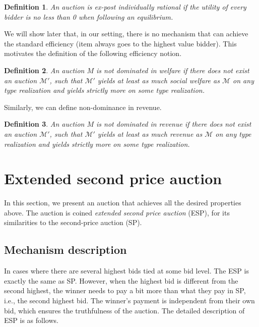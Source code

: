 \documentclass[letterpaper]{article}
\newtheorem{definition}{Definition}
\begin{document}
\begin{definition}
	An auction is {\em ex-post individually rational} if the utility of every bidder is no less than 0 when following an equilibrium.
\end{definition}

We will show later that, in our setting, there is no mechanism that can achieve the standard efficiency (item always goes to the highest value bidder). This motivates the definition of the following efficiency notion.

\begin{definition}
	An auction $M$ is not dominated in welfare if there does not exist an auction $\mathcal{M'}$, such that $\mathcal{M'}$ yields at least as much social welfare as $\mathcal{M}$ on any type realization and yields strictly more on some type realization.
\end{definition}

Similarly, we can define non-dominance in revenue.

\begin{definition}
	An auction $M$ is not dominated in revenue if there does not exist an auction $\mathcal{M'}$, such that $\mathcal{M'}$ yields at least as much revenue as $\mathcal{M}$ on any type realization and yields strictly more on some type realization.
\end{definition}


\section{Extended second price auction}

In this section, we present an auction that achieves all the desired properties above.
The auction is coined \textit{extended second price auction} (ESP), for its similarities to the second-price auction (SP).

\subsection{Mechanism description}

In cases where there are several highest bids tied at some bid level. The ESP is exactly the same as SP. However, when the highest bid is different from the second highest, the winner needs to pay a bit more than what they pay in SP, i.e., the second highest bid. The winner's payment is independent from their own bid, which ensures the truthfulness of the auction. The detailed description of ESP is as follows.
\end{document}
